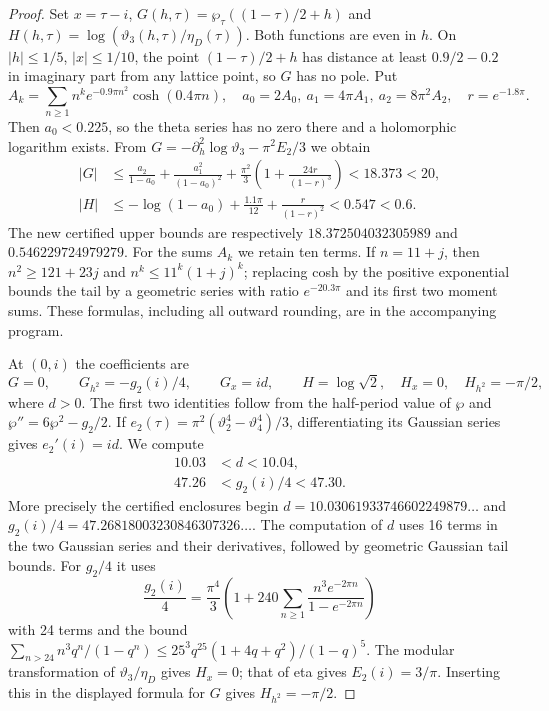 \begin{proof}
Set $x=\tau-i$, $G(h,\tau)=\wp_\tau((1-\tau)/2+h)$ and
$H(h,\tau)=\log(\vartheta_3(h,\tau)/\eta_D(\tau))$.
Both functions are even in $h$. On $|h|\leq1/5$, $|x|\leq1/10$,
the point $(1-\tau)/2+h$ has distance at least $0.9/2-0.2$ in
imaginary part from any lattice point, so $G$ has no pole.
Put
\[
 A_k=\sum_{n\geq1}n^ke^{-0.9\pi n^2}\cosh(0.4\pi n),
 \quad a_0=2A_0,\ a_1=4\pi A_1,\ a_2=8\pi^2A_2,
 \quad r=e^{-1.8\pi}.
\]
Then $a_0<0.225$, so the theta series has no zero there and a
holomorphic logarithm exists. From
$G=-\partial_h^2\log\vartheta_3-\pi^2E_2/3$ we obtain
\[
 \begin{aligned}
 |G|&\leq\frac{a_2}{1-a_0}+
 \frac{a_1^2}{(1-a_0)^2}+
 \frac{\pi^2}{3}\left(1+\frac{24r}{(1-r)^3}\right)<18.373<20,\\
 |H|&\leq-\log(1-a_0)+\frac{1.1\pi}{12}
                  +\frac{r}{(1-r)^2}<0.547<0.6.
 \end{aligned}
\]
The new certified upper bounds are respectively
$18.372504032305989$ and $0.546229724979279$.
For the sums $A_k$ we retain ten terms. If $n=11+j$, then
$n^2\geq121+23j$ and $n^k\leq11^k(1+j)^k$; replacing cosh by
the positive exponential bounds the tail by a geometric series with
ratio $e^{-20.3\pi}$ and its first two moment sums. These formulas,
including all outward rounding, are in the accompanying program.

At $(0,i)$ the coefficients are
\[
 G=0,\qquad G_{h^2}=-g_2(i)/4,\qquad G_x=id,
 \qquad H=\log\sqrt2,\quad H_x=0,\quad H_{h^2}=-\pi/2,
\]
where $d>0$. The first two identities follow from the half-period
value of $\wp$ and $\wp''=6\wp^2-g_2/2$. If
$e_2(\tau)=\pi^2(\vartheta_2^4-\vartheta_4^4)/3$, differentiating
its Gaussian series gives $e_2'(i)=id$. We compute
\[
 \begin{split}
 10.03&<d<10.04,\\
 47.26&<g_2(i)/4<47.30.
 \end{split}
\]
More precisely the certified enclosures begin
$d=10.03061933746602249879\ldots$ and
$g_2(i)/4=47.26818003230846307326\ldots$.
The computation of $d$ uses 16 terms in the two Gaussian series and
their derivatives, followed by geometric Gaussian tail bounds.
For $g_2/4$ it uses
\[
 \frac{g_2(i)}4=\frac{\pi^4}{3}
 \left(1+240\sum_{n\geq1}\frac{n^3e^{-2\pi n}}{1-e^{-2\pi n}}\right)
\]
with 24 terms and the bound
$\sum_{n>24}n^3q^n/(1-q^n)
\leq25^3q^{25}(1+4q+q^2)/(1-q)^5$.
The modular transformation of $\vartheta_3/\eta_D$ gives $H_x=0$;
that of eta gives $E_2(i)=3/\pi$. Inserting this in the displayed
formula for $G$ gives $H_{h^2}=-\pi/2$.


\end{proof}
